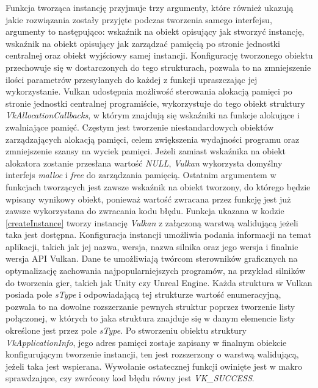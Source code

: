 Funkcja tworząca instancję przyjmuje trzy argumenty, które również ukazują jakie rozwiązania zostały przyjęte podczas tworzenia samego interfejsu, argumenty to następująco: wskaźnik na obiekt opisujący jak stworzyć instancję, wskaźnik na obiekt opisujący jak zarządzać pamięcią po stronie jednostki centralnej oraz obiekt wyjściowy samej instancji.
Konfigurację tworzonego obiektu przechowuje się w dostarczonych do tego strukturach, pozwala to na zmniejszenie ilości parametrów przesyłanych do każdej z funkcji upraszczając jej wykorzystanie.
Vulkan udostępnia możliwość sterowania alokacją pamięci po stronie jednostki centralnej programiście, wykorzystuje do tego obiekt struktury \textit{VkAllocationCallbacks}, w którym znajdują się wskaźniki na funkcje alokujące i zwalniające pamięć.
Częstym jest tworzenie niestandardowych obiektów zarządzających alokacją pamięci, celem zwiększenia wydajności programu oraz zmniejszenie szansy na wyciek pamięci. 
Jeżeli zamiast wskaźnika na obiekt alokatora zostanie przesłana wartość \textit{NULL}, \textit{Vulkan} wykorzysta domyślny interfejs \textit{malloc} i \textit{free} do zarządzania pamięcią.
Ostatnim argumentem w funkcjach tworzących jest zawsze wskaźnik na obiekt tworzony, do którego będzie wpisany wynikowy obiekt, ponieważ wartość zwracana przez funkcję jest już zawsze wykorzystana do zwracania kodu błędu.
Funkcja ukazana w kodzie \ref{createInstance} tworzy instancję \textit{Vulkan} z załączoną warstwą walidującą jeżeli taka jest dostępna.
Konfiguracja instancji umożliwia podania informacji na temat aplikacji, takich jak jej nazwa, wersja, nazwa silnika oraz jego wersja i finalnie wersja API Vulkan.
Dane te umożliwiają twórcom sterowników graficznych na optymalizację zachowania najpopularniejszych programów, na przykład silników do tworzenia gier, takich jak Unity czy Unreal Engine. %
Każda struktura w Vulkan posiada pole \textit{sType} i odpowiadającą tej strukturze wartość enumeracyjną, pozwala to na dowolne rozszerzanie pewnych struktur poprzez tworzenie listy połączonej, w których to jaka struktura znajduje się w danym elemencie listy określone jest przez pole \textit{sType}.
Po stworzeniu obiektu struktury \textit{VkApplicationInfo}, jego adres pamięci zostaje zapisany w finalnym obiekcie konfigurującym tworzenie instancji, ten jest rozszerzony o warstwą walidującą, jeżeli taka jest wspierana.
Wywołanie ostatecznej funkcji owinięte jest w makro sprawdzające, czy zwrócony kod błędu równy jest \textit{VK\_SUCCESS}.

